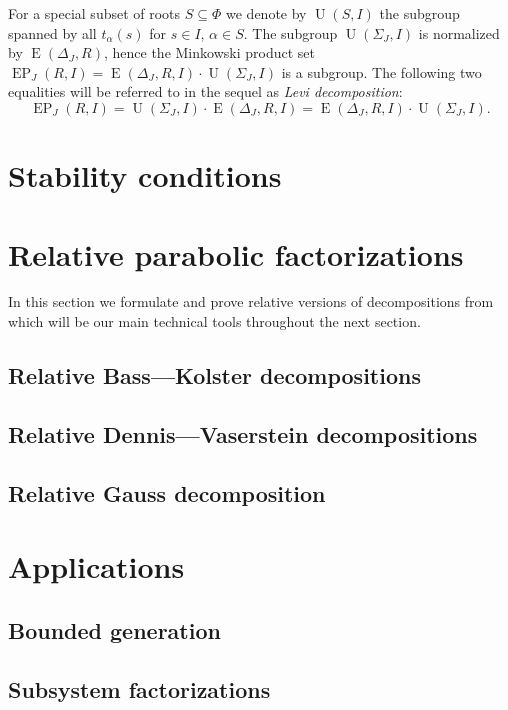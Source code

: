\documentclass[12pt]{amsart}
\numberwithin{equation}{section}
\theoremstyle{definition}
\DeclareMathOperator{\E}{E}
\DeclareMathOperator{\EP}{EP}
\DeclareMathOperator{\U}{U}
\begin{document}
For a special subset of roots $S\subseteq \Phi$ we denote by $\U(S, I)$ the subgroup spanned by all $t_{\alpha}(s)$ for $s\in I$, $\alpha\in S$.
The subgroup $\U(\Sigma_J, I)$ is normalized by $\E(\Delta_J, R)$, hence the Minkowski product set $\EP_J(R, I) = \E(\Delta_J, R, I) \cdot \U(\Sigma_J, I)$ is a subgroup. 
The following two equalities will be referred to in the sequel as {\it Levi decomposition}: 
$$\EP_J(R, I) = \U(\Sigma_J, I) \cdot \E(\Delta_J, R, I) = \E(\Delta_J, R, I) \cdot \U(\Sigma_J, I).$$

\section{Stability conditions}\label{sec:stability-conditions}


\section{Relative parabolic factorizations} \label{sec:factorizations}
In this section we formulate and prove relative versions of decompositions from~\cite{St78} which will be our main technical tools throughout the next section.

\subsection{Relative Bass---Kolster decompositions}\label{sec:bass-kolster}

\subsection{Relative Dennis---Vaserstein decompositions}\label{sec:dennis-vaserstein}

\subsection{Relative Gauss decomposition}\label{sec:gauss}


\section{Applications}\label{sec:applications}
\subsection{Bounded generation}\label{sec:boundgen}

\subsection{Subsystem factorizations}\label{sec:subsysfact}


\printbibliography
\end{document}
